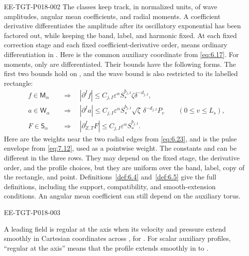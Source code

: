 \begin{EESegment}{EE-TGT-P018-002}
The classes  keep
track, in normalized units, of wave amplitudes, angular mean coefficients, and radial
moments. A coefficient derivative differentiates the amplitude after its oscillatory
exponential has been factored out, while keeping the band, label, and harmonic fixed. At
each fixed correction stage and each fixed coefficient-derivative order,
 means ordinary differentiation in
. Here  is the common auxiliary
coordinate from \eqref{eq:6.17}. For moments, only  are
differentiated. Their bounds have the following forms. The first two bounds hold on
, and the wave bound is also restricted to its labelled
rectangle:
\[
\begin{aligned}
f\in \mathsf M_\alpha
&\quad\Longrightarrow\quad
|\partial^If|\leq C_{j,I}\varepsilon^\alpha S_*^{b_{j,I}}\zeta\delta^{-d_{j,I}},\\
a\in \mathsf W_\alpha
&\quad\Longrightarrow\quad
|\partial^Ia|\leq C_{j,I}\varepsilon^\alpha S_*^{b_{j,I}}\sqrt\zeta\,\delta^{-d_{j,I}}P_v
\qquad(0\leq v\leq L_s),\\
F\in \mathsf S_\alpha
&\quad\Longrightarrow\quad
|\partial_{Z,T}^IF|\leq C_{j,I}\varepsilon^\alpha S_*^{b_{j,I}}.
\end{aligned}
\]
Here  are the weights near the two radial edges from
\eqref{eq:6.23}, and  is the pulse envelope from
\eqref{eq:7.12}, used as a pointwise weight. The constants
 and  can be
different in the three rows. They may depend on the fixed stage, the derivative order, and
the profile choices, but they are uniform over the band, label, copy of the rectangle, and
point. Definitions~\ref{def:6.4} and~\ref{def:6.5} give the full definitions, including the
support, compatibility, and smooth-extension conditions. An angular mean coefficient can
still depend on the auxiliary torus.
\end{EESegment}

\begin{EESegment}{EE-TGT-P018-003}
\begin{definition}\label{def:3.2}
A leading field is regular at the axis when its velocity and pressure extend smoothly in
Cartesian coordinates across , for
. For scalar auxiliary profiles, ``regular at the axis'' means that
the profile extends smoothly in  to
.
\end{definition}
\end{EESegment}

